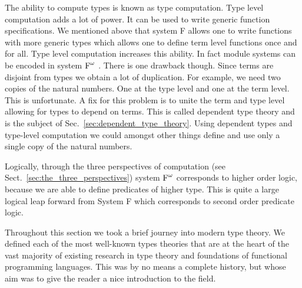 The ability to compute types is known as type computation.  Type level
computation adds a lot of power.  It can be used to write generic
function specifications.  We mentioned above that system F allows one
to write functions with more generic types which allows one to define
term level functions once and for all.  Type level computation
increases this ability.  In fact module systems can be encoded in
system $\text{F}^\omega$ \cite{Shan:2006}.  There is one drawback though.  Since
terms are disjoint from types we obtain a lot of duplication.  For
example, we need two copies of the natural numbers.  One at the type
level and one at the term level.  This is unfortunate.  A fix for this
problem is to unite the term and type level allowing for types to
depend on terms.  This is called dependent type theory and is the
subject of Sec.~\ref{sec:dependent_type_theory}.  Using dependent
types and type-level computation we could amongst other things define
and use only a single copy of the natural numbers.

Logically, through the three perspectives of computation (see
Sect.~\ref{sec:the_three_perspectives}) system $\text{F}^\omega$ corresponds to
higher order logic, because we are able to define predicates of higher
type.  This is quite a large logical leap forward from System F which
corresponds to second order predicate logic.

Throughout this section we took a brief journey into modern type
theory.  We defined each of the most well-known types theories that
are at the heart of the vast majority of existing research in type
theory and foundations of functional programming languages.  This was
by no means a complete history, but whose aim was to give the reader a
nice introduction to the field.
